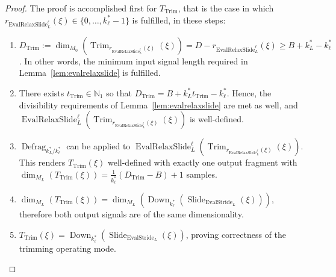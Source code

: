 \documentclass[journal]{IEEEtran}
\newcommand{\N}{\mathbb{N}}
\newcommand{\ROI}{B}
\newcommand{\discint}[2]{\{#1,\dotsc,#2\}}
\newcommand{\inint}[2]{\in\discint{#1}{#2}}
\DeclareMathOperator{\Slide}{Slide}
\DeclareMathOperator{\Defragmentation}{Defrag}
\DeclareMathOperator{\EvalStride}{EvalStride}
\DeclareMathOperator{\Trimming}{Trim}
\DeclareMathOperator{\EvalRelaxSlide}{EvalRelaxSlide}
\DeclareMathOperator{\Downsampling}{Down}
\begin{document}
\begin{proof}
The proof is accomplished first for $T_{\Trimming}$, that is the case in which $r_{\EvalRelaxSlide_L^\ell}(\xi)\inint{0}{k_\ell^* - 1}$ is fulfilled, in these steps:
\begin{enumerate}\setlength{\baselineskip}{1.1\baselineskip}
  \setcounter{enumi}{2}
  \item \label{thm:evalrelaxslide-trim-a} $D_{\Trimming} := \dim_{M_0}( \Trimming_{r_{\EvalRelaxSlide_L^\ell}(\xi)}(\xi) ) = D - r_{\EvalRelaxSlide_L^\ell}(\xi) \geq \ROI + k_L^* - k_\ell^*$. In other words, the minimum input signal length required in Lemma~\ref{lem:evalrelaxslide} is fulfilled.
  \item \label{thm:evalrelaxslide-trim-b} There exists $t_{\Trimming}\in\N_1$ so that $D_{\Trimming} = \ROI + k_L^*t_{\Trimming} - k_\ell^*$. Hence, the divisibility requirements of Lemma~\ref{lem:evalrelaxslide} are met as well, and $\EvalRelaxSlide_L^\ell( \Trimming_{r_{\EvalRelaxSlide_L^\ell}(\xi)}(\xi) )$ is well-defined.
  \item \label{thm:evalrelaxslide-trim-c} $\Defragmentation_{k_L^* / k_\ell^*}$ can be applied to $\EvalRelaxSlide_L^\ell( \Trimming_{r_{\EvalRelaxSlide_L^\ell}(\xi)}(\xi) )$. This renders $T_{\Trimming}(\xi)$ well-defined with exactly one output fragment with $\dim_{M_L}( T_{\Trimming}(\xi) ) = \tfrac{1}{k_\ell^*}(D_{\Trimming} - \ROI) + 1$ samples.
  \item \label{thm:evalrelaxslide-trim-d} $\dim_{M_L}( T_{\Trimming}(\xi) ) = \dim_{M_L}( \Downsampling_{k_\ell^*}( \Slide_{\EvalStride_L}(\xi) ) )$, therefore both output signals are of the same dimensionality.
  \item \label{thm:evalrelaxslide-trim-e} $T_{\Trimming}(\xi) = \Downsampling_{k_\ell^*}( \Slide_{\EvalStride_L}(\xi) )$, proving correctness of the trimming operating mode.
\end{enumerate}


\end{proof}
\end{document}
